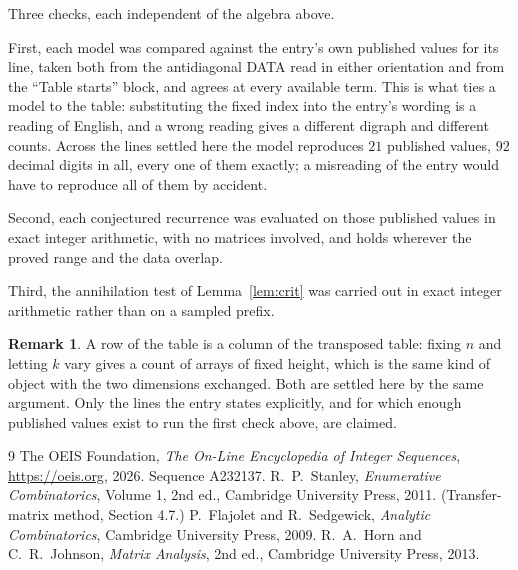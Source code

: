 \documentclass[11pt,a4paper]{article}
\theoremstyle{plain}
\theoremstyle{definition}
\newtheorem{remark}[theorem]{Remark}
\begin{document}
Three checks, each independent of the algebra above.

First, each model was compared against the entry's own published values for its line, taken
both from the antidiagonal DATA read in either orientation and from the ``Table starts''
block, and agrees at every available term. This is what ties a model to the table:
substituting the fixed index into the entry's wording is a reading of English, and a wrong
reading gives a different digraph and different counts. Across the lines settled here the
model reproduces $21$ published values, $92$ decimal digits in all, every one of
them exactly; a misreading of the entry would have to reproduce all of them by accident.

Second, each conjectured recurrence was evaluated on those published values in exact
integer arithmetic, with no matrices involved, and holds wherever the proved range and the
data overlap.

Third, the annihilation test of Lemma~\ref{lem:crit} was carried out in exact integer
arithmetic rather than on a sampled prefix.

\begin{remark}
A row of the table is a column of the transposed table: fixing $n$ and letting $k$ vary gives a
count of arrays of fixed height, which is the same kind of object with the two dimensions
exchanged. Both are settled here by the same argument. Only the lines the entry states
explicitly, and for which enough published values exist to run the first check above, are
claimed.
\end{remark}

\begin{thebibliography}{9}
 The OEIS Foundation, \emph{The On-Line Encyclopedia of Integer
Sequences}, \url{https://oeis.org}, 2026. Sequence A232137.
 R.~P.~Stanley, \emph{Enumerative Combinatorics}, Volume 1, 2nd ed.,
Cambridge University Press, 2011. (Transfer-matrix method, Section 4.7.)
 P.~Flajolet and R.~Sedgewick, \emph{Analytic Combinatorics}, Cambridge
University Press, 2009.
 R.~A.~Horn and C.~R.~Johnson, \emph{Matrix Analysis}, 2nd ed., Cambridge
University Press, 2013.
\end{thebibliography}
\end{document}
